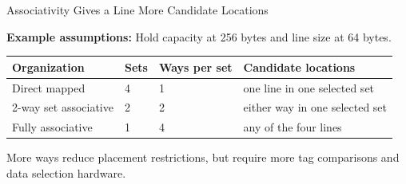 \documentclass[aspectratio=169,11pt,t]{beamer}
\newcommand{\Model}[1]{\par{\scriptsize\color{deepblue}\textbf{Example assumptions:} #1\par}\vspace{.14cm}}
\begin{document}
\begin{frame}{Associativity Gives a Line More Candidate Locations}
\small
\Model{Hold capacity at 256 bytes and line size at 64 bytes.}
\renewcommand{\arraystretch}{1.4}
\setlength{\tabcolsep}{4pt}
\begin{tabular}{R{4.0cm}R{1.8cm}R{2.4cm}R{4.3cm}}
\toprule
\textbf{Organization} & \textbf{Sets} & \textbf{Ways per set} & \textbf{Candidate locations}\\
\midrule
Direct mapped & 4 & 1 & one line in one selected set\\
2-way set associative & 2 & 2 & either way in one selected set\\
Fully associative & 1 & 4 & any of the four lines\\
\bottomrule
\end{tabular}\par
\vspace{.22cm}
\begin{center}
\end{center}
\small More ways reduce placement restrictions, but require more tag comparisons and data selection hardware.
\end{frame}
\end{document}
